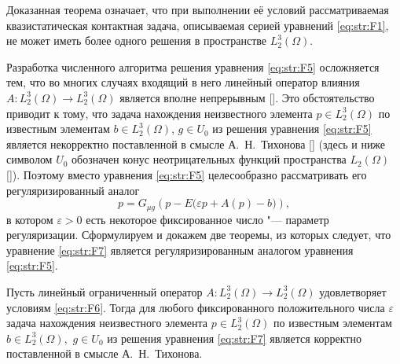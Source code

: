 \smallskip

Доказанная теорема означает, что при выполнении её условий рассматриваемая квазистатическая контактная задача, описываемая серией уравнений \eqref{eq:str:F1}, не может иметь более одного решения в пространстве $L_{2}^{3} (\Omega)$.

\smallskip

Разработка численного алгоритма решения уравнения \eqref{eq:str:F5} осложняется тем, что во многих случаях входящий в него линейный оператор влияния $A \colon L_{2}^{3} (\Omega)\to L_{2}^{3} (\Omega)$ является вполне непрерывным [].
Это обстоятельство приводит к тому, что задача нахождения неизвестного элемента $p\in L_{2}^{3} (\Omega)$ по известным элементам $b\in L_{2}^{3} (\Omega)$, $g\in U_{0} $ из решения уравнения \eqref{eq:str:F5} является некорректно поставленной в смысле А.~Н.~Тихонова [] (здесь и ниже символом $U_{0} $ обозначен конус неотрицательных функций пространства $L_{2} (\Omega)$ []).
Поэтому вместо уравнения \eqref{eq:str:F5} целесообразно рассматривать его регуляризированный аналог
\begin{equation}
\label{eq:str:F7} 
p=G_{\mu g} \left(p-E  \bigl(\varepsilon  p+A(p)-b\bigr)\right), 
\end{equation}                            
в котором $\varepsilon > 0$ есть некоторое фиксированное число "--- параметр регуляризации.
Сформулируем и докажем две теоремы, из которых следует, что уравнение \eqref{eq:str:F7} является регуляризированным аналогом уравнения \eqref{eq:str:F5}.

\smallskip
\hypertarget{str:th2}{}
\begin{theorem}[2]Пусть линейный ограниченный оператор $A\colon L_{2}^{3} (\Omega)\to L_{2}^{3} (\Omega)$ удовлетворяет условиям \eqref{eq:str:F6}$.$
Тогда для любого фиксированного положительного числа $\varepsilon $ задача нахождения неизвестного элемента $p\in L_{2}^{3} (\Omega)$ по известным элементам $b\in L_{2}^{3} (\Omega),$ $g\in U_{0} $ из решения уравнения \eqref{eq:str:F7} является корректно поставленной в смысле А$.$~Н$.$~Тихонова$.$
\end{theorem}

\smallskip

